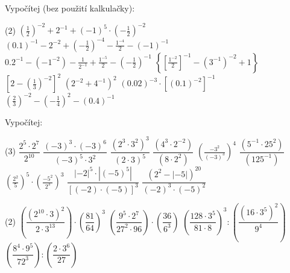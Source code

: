 \documentclass[12pt,a4paper]{article}
\begin{document}
\begin{exercise}
    Vypočítej (bez použití kalkulačky):
    \begin{tasks}(2)
        \task $\left(\tfrac{1}{2}\right)^{-2} + 2^{-1} + (-1)^{5} \cdot \left(-\tfrac{1}{2}\right)^{-2}$
        \task $(0.1)^{-1} - 2^{-2} + \left(-\tfrac{1}{2}\right)^{-4} - \tfrac{1^{-4}}{2} - (-1)^{-1}$
        \task $0.2^{-1} - (-1^{-2}) - \tfrac{1}{2^{-1}} + \tfrac{1^{-5}}{2} - \left(-\tfrac{1}{2}\right)^{-1}$
        \task $\left\{\left[\tfrac{1^{-2}}{2}\right]^{-1} - (3^{-1})^{-2} + 1\right\}$
        \task $\left[2 - \left(\tfrac{1}{3}\right)^{-2}\right]^{2}$
        \task $\left(2^{-2} + 4^{-1}\right)^{2}$
        \task $(0.02)^{-3} \cdot \left[(0.1)^{-2}\right]^{-1}$
        \task $\left(\tfrac{2}{3}\right)^{-2} - \left(-\tfrac{1}{4}\right)^{2} - (0.4)^{-1}$
     \end{tasks}
\end{exercise}


\begin{exercise}
    Vypočítej:
    \begin{tasks}(3)
        \task $\dfrac{2^{5}\cdot 2^{7}}{2^{10}}$
        \task $\dfrac{(-3)^{3}\cdot (-3)^{6}}{(-3)^{5}\cdot 3^{2}}$
        \task $\dfrac{(2^{3}\cdot 3^{2})^{3}}{(2\cdot 3)^{5}}$
        \task $\dfrac{(4^{3}\cdot 2^{-2})}{(8 \cdot 2^{2})}$
        \task $\left(\tfrac{-3^{2}}{(-3)^{3}}\right)^{4}$
        \task $\dfrac{(5^{-1}\cdot 25^{2})}{(125^{-1})}$  
        \task $\left(\tfrac{2^{2}}{5}\right)^{5} \cdot \left(\tfrac{-5^{2}}{2^{3}}\right)^{3}$
        \task $\dfrac{|{-2}|^{5} \cdot |{(-5)}^{5}|}{[(-2)\cdot (-5)]^{3}}$
        \task $\dfrac{(2^{2} - |{-5}|)^{20}}{(-2)^{3}\cdot (-5)^{2}}$
    \end{tasks}
\end{exercise}


\begin{exercise}
    \begin{tasks}(2)
        \task $\left(\dfrac{(2^{10}\!\cdot 3)^{2}}{2\cdot 3^{13}}\right)\cdot\left(\dfrac{81}{64}\right)^{3}$
        \task $\left(\dfrac{9^{5}\cdot 2^{7}}{27^{2}\cdot 96}\right)\cdot\left(\dfrac{36}{6^{3}}\right)$
        \task $\left(\dfrac{128\cdot 3^{5}}{81\cdot 8}\right)^{3} : \left(\dfrac{(16\cdot 3^{5})^{2}}{9^{4}}\right)$
        \task $\left(\dfrac{8^{4}\cdot 9^{5}}{72^{3}}\right) : \left(\dfrac{2\cdot 3^{6}}{27}\right)$
    \end{tasks}
\end{exercise}
\end{document}
